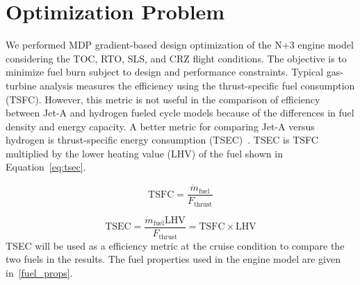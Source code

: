 \documentclass[conf]{new-aiaa}
\begin{document}
\section{Optimization Problem}
\label{sec:optprob}
We performed MDP gradient-based design optimization of the N+3 engine model considering the TOC, RTO, SLS, and CRZ flight conditions.
The objective is to minimize fuel burn subject to design and performance constraints.
Typical gas-turbine analysis measures the efficiency using the thrust-specific fuel consumption (TSFC).
However, this metric is not useful in the comparison of efficiency between Jet-A and hydrogen fueled cycle models because of the differences in fuel density and energy capacity.
A better metric for comparing Jet-A versus hydrogen is thrust-specific energy consumption (TSEC)~\cite{Adler2023}.
TSEC is TSFC multiplied by the lower heating value (LHV) of the fuel shown in Equation~\eqref{eq:tsec}.

\begin{equation}
  \mathrm{TSFC} = \frac{\dot{m}_{\mathrm{fuel}}}{F_{\mathrm{thrust}}}
  \label{eq:tsfc}
\end{equation}

\begin{equation}
  \mathrm{TSEC} = \frac{\dot{m}_{\mathrm{fuel}} \mathrm{LHV}}{F_{\mathrm{thrust}}} = \mathrm{TSFC} \times \mathrm{LHV}
  \label{eq:tsec}
\end{equation}
TSEC will be used as a efficiency metric at the cruise condition to compare the two fuels in the results.
The fuel properties used in the engine model are given in~\ref{fuel_props}.
\end{document}
